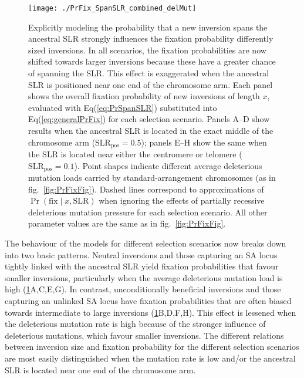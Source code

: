 \documentclass{article}[12pt]
\begin{document}
 \begin{figure}[H]
 \centering
 \texttt{[image: ./PrFix\_SpanSLR\_combined\_delMut]}
 \caption{Explicitly modeling the probability that a new inversion spans the ancestral SLR strongly influences the fixation probability differently sized inversions. In all scenarios, the fixation probabilities are now shifted towards larger inversions because these have a greater chance of spanning the SLR. This effect is exaggerated when the ancestral SLR is positioned near one end of the chromosome arm. Each panel shows the overall fixation probability of new inversions of length $x$, evaluated with Eq(\ref{eq:PrSpanSLR}) substituted into Eq(\ref{eq:generalPrFix}) for each selection scenario. Panels A--D show results when the ancestral SLR is located in the exact middle of the chromosome arm ($\text{SLR}_\text{pos} = 0.5$); panels E--H show the same when the SLR is located near either the centromere or telomere ($\text{SLR}_\text{pos} = 0.1$). Point shapes indicate different average deleterious mutation loads carried by standard-arrangement chromosomes (as in fig.~\ref{fig:PrFixFig}). Dashed lines correspond to approximations of $\Pr(\text{fix} \mid x, \text{SLR})$ when ignoring the effects of partially recessive deleterious mutation pressure for each selection scenario. All other parameter values are the same as in fig.~\ref{fig:PrFixFig}.}
 \label{fig:PrSLRFixFig}
 \end{figure}

The behaviour of the models for different selection scenarios now breaks down into two basic patterns. Neutral inversions and those capturing an SA locus tightly linked with the ancestral SLR yield fixation probabilities that favour smaller inversions, particularly when the average deleterious mutation load is high (\ref{fig:PrSLRFixFig}A,C,E,G). In contrast, unconditionally beneficial inversions and those capturing an unlinked SA locus have fixation probabilities that are often biased towards intermediate to large inversions (\ref{fig:PrSLRFixFig}B,D,F,H). This effect is lessened when the deleterious mutation rate is high because of the stronger influence of deleterious mutations, which favour smaller inversions. The different relations between inversion size and fixation probability for the different selection scenarios are most easily distinguished when the mutation rate is low and/or the ancestral SLR is located near one end of the chromosome arm.
\end{document}
